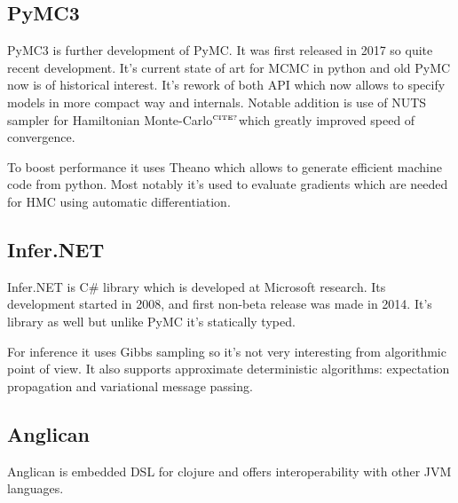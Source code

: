 \documentclass[a4paper]{article}
\newcommand{\citationneeded}{\textcolor{red}{$^{\mbox{\tiny{CITE?}}}$}}
\begin{document}
\subsection{PyMC3}
PyMC3\cite{salvatier2016pymc3} is further development of PyMC. It was first
released in 2017 so quite recent development. It's current state of art for MCMC
in python and old PyMC now is of historical interest. It's rework of both API
which now allows to specify models in more compact way and internals. Notable
addition is use of NUTS\cite{hoffman2014NUTS} sampler for Hamiltonian
Monte-Carlo\citationneeded which greatly improved speed of convergence.

To boost performance it uses
Theano\cite{bergstra2010theano}\cite{arXiv1211.5590} which allows to generate
efficient machine code from python. Most notably it's used to evaluate gradients
which are needed for HMC using automatic differentiation.


\subsection{Infer.NET}

Infer.NET\cite{InferNET14} is C\# library which is developed at Microsoft
research. Its development started in 2008, and first non-beta release was made
in 2014. It's library as well but unlike PyMC it's statically typed.

For inference it uses Gibbs sampling so it's not very interesting from
algorithmic point of view. It also supports approximate deterministic
algorithms: expectation propagation\cite{minka2001expectation} and variational
message passing\cite{winn2005variational}.

\subsection{Anglican}

Anglican\cite{tolpin2016anglican} is embedded DSL for clojure and offers
interoperability with other JVM languages. 




\end{document}
